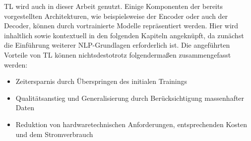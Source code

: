 \noindent
\ac{TL} wird auch in dieser Arbeit genutzt. Einige Komponenten der bereits vorgestellten Architekturen, wie beispielsweise der Encoder oder auch der Decoder, können durch vortrainierte Modelle repräsentiert werden. Hier wird inhaltlich sowie kontextuell in den folgenden Kapiteln angeknüpft, da zunächst die Einführung weiterer \ac{NLP}-Grundlagen erforderlich ist. Die angeführten Vorteile von \ac{TL} können nichtsdestotrotz folgendermaßen zusammengefasst werden:

\begin{itemize}
	\item Zeitersparnis durch Überspringen des initialen Trainings
	\item Qualitätsanstieg und Generalisierung durch Berücksichtigung massenhafter Daten
	\item Reduktion von hardwaretechnischen Anforderungen, entsprechenden Kosten und dem Stromverbrauch
\end{itemize}
